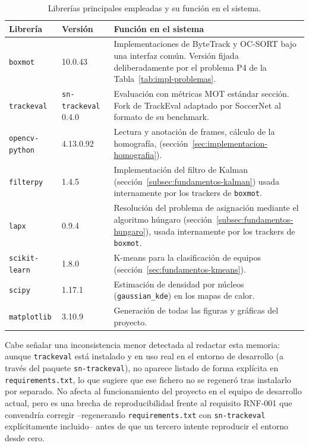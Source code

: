 \begin{table}[htp]
\centering
\caption{Librerías principales empleadas y su función en el sistema.}
\label{tab:impl-librerias}
\renewcommand{\arraystretch}{1.25}
\begin{tabular}{|p{2.6cm}|p{2.5cm}|p{7.0cm}|}
\hline
\rowcolor{gray!25}
\textbf{Librería} & \textbf{Versión} & \textbf{Función en el sistema} \\
\hline
\texttt{boxmot} & 10.0.43 & Implementaciones de ByteTrack y OC-SORT bajo una
  interfaz común. Versión fijada
  deliberadamente por el problema P4 de la
  Tabla~\ref{tab:impl-problemas}. \\
\hline
\texttt{trackeval} & \texttt{sn-trackeval} 0.4.0 & Evaluación con
  métricas MOT estándar
  sección. Fork de TrackEval adaptado por
  SoccerNet al formato de su benchmark. \\
\hline
\texttt{opencv-python} & 4.13.0.92 & Lectura y anotación de frames,
  cálculo de la homografía, (sección~\ref{sec:implementacion-homografia}). \\
\hline
\texttt{filterpy} & 1.4.5 & Implementación del filtro de Kalman
  (sección~\ref{subsec:fundamentos-kalman}) usada internamente por los
  trackers de \texttt{boxmot}. \\
\hline
\texttt{lapx} & 0.9.4 & Resolución del problema de asignación mediante el
  algoritmo húngaro (sección~\ref{subsec:fundamentos-hungaro}), usada
  internamente por los trackers de \texttt{boxmot}. \\
\hline
\texttt{scikit-learn} & 1.8.0 & K-means para la clasificación de equipos
  (sección~\ref{sec:fundamentos-kmeans}). \\
\hline
\texttt{scipy} & 1.17.1 & Estimación de densidad por núcleos
  (\texttt{gaussian\_kde}) en los mapas de calor. \\
\hline
\texttt{matplotlib} & 3.10.9 & Generación de todas las figuras y gráficas
  del proyecto. \\
\hline
\end{tabular}
\end{table}

Cabe señalar una inconsistencia menor detectada al redactar esta memoria:
aunque \texttt{trackeval} está instalado y en uso real en el entorno de
desarrollo (a través del paquete \texttt{sn-trackeval}), no aparece listado
de forma explícita en \texttt{requirements.txt}, lo que sugiere que ese
fichero no se regeneró tras instalarlo por separado. No afecta al
funcionamiento del proyecto en el equipo de desarrollo actual, pero es una
brecha de reproducibilidad frente al requisito RNF-001 que convendría
corregir --regenerando \texttt{requirements.txt} con \texttt{sn-trackeval}
explícitamente incluido-- antes de que un tercero intente reproducir el
entorno desde cero.


